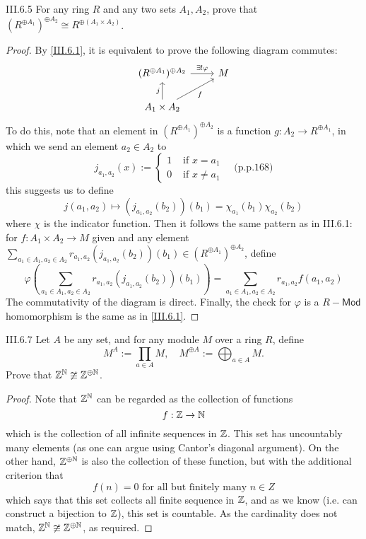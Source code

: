 \begin{problem}{III.6.5}
For any ring $R$ and any two sets $A_1, A_2$, prove that $(R^{\oplus A_1})^{\oplus A_2} \cong R^{\oplus(A_1 \times A_2)}$.
\end{problem}
\begin{proof}
By \ref{III.6.1}, it is equivalent to prove the following diagram commutes:
\[
\begin{tikzcd}
(R^{\oplus A_1})^{\oplus A_2} \arrow[r, "\exists!\varphi"] & M \\
A_1 \times A_2 \arrow[ru, "f"'] \arrow[u, "j"]             &
\end{tikzcd}
\]
To do this, note that an element in $(R^{\oplus A_1})^{\oplus A_2}$ is a function $g : A_2 \to R^{\oplus A_1}$, in which we send an element $a_2 \in A_2$ to
\[
j_{a_1, a_2}(x) := \begin{cases}
1 &\text{ if } x = a_1 \\
0 &\text{ if } x \neq a_1
\end{cases}	\quad \text{(p.p.168)}
\]
this suggests us to define
\[
j(a_1,a_2) \mapsto (j_{a_1,a_2}(b_2))(b_1) = \chi_{a_1}(b_1)\chi_{a_2}(b_2)
\]
where $\chi$ is the indicator function. Then it follows the same pattern as in III.6.1: for $f : A_1 \times A_2 \to M$ given and any element $\sum_{a_1 \in A_1, a_2 \in A_2} r_{a_1,a_2} (j_{a_1,a_2}(b_2))(b_1) \in (R^{\oplus A_1})^{\oplus A_2}$, define
\[
\varphi \left(\sum_{a_1 \in A_1, a_2 \in A_2} r_{a_1,a_2} (j_{a_1,a_2}(b_2))(b_1)\right) = \sum_{a_1 \in A_1, a_2 \in A_2} r_{a_1,a_2} f(a_1,a_2)
\]
The commutativity of the diagram is direct. Finally, the check for $\varphi$ is a $R-\mathsf{Mod}$ homomorphism is the same as in \ref{III.6.1}.
\end{proof}

\begin{problem}{III.6.7}
Let $A$ be any set, and for any module $M$ over a ring $R$, define
\[
M^A	:= \prod_{a \in A}M, \quad M^{\oplus A} := \bigoplus_{a \in A}M.
\]
Prove that $\mathbb{Z}^{\mathbb{N}} \ncong \mathbb{Z}^{\oplus \mathbb{N}}$.
\end{problem}
\begin{proof}
Note that $\mathbb{Z}^{\mathbb{N}}$ can be regarded as the collection of functions
\[
f: \mathbb{Z} \to \mathbb{N}
\]
which is the collection of all infinite sequences in $\mathbb{Z}$. This set has uncountably many elements (as one can argue using Cantor's diagonal argument). On the other hand, $\mathbb{Z}^{\oplus \mathbb{N}}$ is also the collection of these function, but with the additional criterion that
\[
f(n) = 0 \text{ for all but finitely many }	n \in Z
\]
which says that this set collects all finite sequence in $\mathbb{Z}$, and as we know (i.e. can construct a bijection to $\mathbb{Z}$), this set is countable. As the cardinality does not match, $\mathbb{Z}^{\mathbb{N}} \ncong \mathbb{Z}^{\oplus \mathbb{N}}$, as required.
\end{proof}

